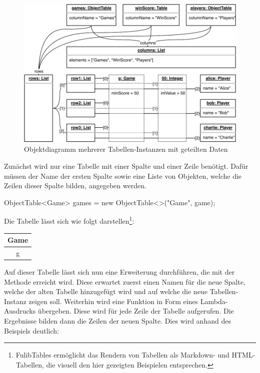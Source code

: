 \begin{figure}
    \includegraphics[width=\textwidth]{chapter/pattern-matching/img/tables-object-diagram.pdf}
    \caption{Objektdiagramm mehrerer Tabellen-Instanzen mit geteilten Daten}
    \label{fig:tables-object-diagram}
\end{figure}

Zunächst wird nur eine Tabelle mit einer Spalte und einer Zeile benötigt.
Dafür müssen der Name der ersten Spalte sowie eine Liste von Objekten, welche die Zeilen dieser Spalte bilden, angegeben werden.

\begin{jcodeblock}
    ObjectTable<Game> games = new ObjectTable<>("Game", game);
\end{jcodeblock}

Die Tabelle lässt sich wie folgt darstellen\footnote{FulibTables ermöglicht das Rendern von Tabellen als Markdown- und HTML-Tabellen, die visuell den hier gezeigten Beispielen entsprechen.}:

\begin{tabular}{|c|}
    \hline
    \textbf{Game} \\
    \hline
    g \\
    \hline
\end{tabular}

Auf dieser Tabelle lässt sich nun eine Erweiterung durchführen, die mit der Methode  erreicht wird.
Diese erwartet zuerst einen Namen für die neue Spalte, welche der alten Tabelle hinzugefügt wird und auf welche die neue Tabellen-Instanz zeigen soll.
Weiterhin wird eine Funktion in Form eines Lambda-Ausdrucks übergeben.
Diese wird für jede Zeile der Tabelle aufgerufen.
Die Ergebnisse bilden dann die Zeilen der neuen Spalte.
Dies wird anhand des Beispiels deutlich:

